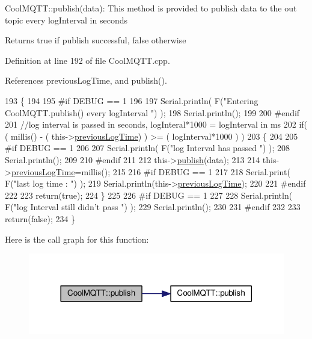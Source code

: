 Cool\+M\+Q\+T\+T\+::publish(data)\+: This method is provided to publish data to the out topic every log\+Interval in seconds

\begin{DoxyReturn}{Returns}
true if publish successful, false otherwise 
\end{DoxyReturn}


Definition at line 192 of file Cool\+M\+Q\+T\+T.\+cpp.



References previous\+Log\+Time, and publish().


\begin{DoxyCode}
193 \{
194 
195 \textcolor{preprocessor}{#if DEBUG == 1 }
196 
197     Serial.println( F(\textcolor{stringliteral}{"Entering CoolMQTT.publish() every logInterval "}) );
198     Serial.println();
199 
200 \textcolor{preprocessor}{#endif }
201     \textcolor{comment}{//log interval is passed in seconds, logInteral*1000 = logInterval in ms}
202     \textcolor{keywordflow}{if}( ( millis() - ( this->\hyperlink{classCoolMQTT_a3db37ef9ed3b05b2a8d44edba0e7d3cc}{previousLogTime})  ) >= ( logInterval*1000 ) )
203     \{
204     
205 \textcolor{preprocessor}{    #if DEBUG == 1}
206 
207         Serial.println( F(\textcolor{stringliteral}{"log Interval has passed "}) );
208         Serial.println();
209     
210 \textcolor{preprocessor}{    #endif}
211 
212         this->\hyperlink{classCoolMQTT_ace977b3e90ab14b1199fe5c4fb0a13ec}{publish}(data);
213 
214         this->\hyperlink{classCoolMQTT_a3db37ef9ed3b05b2a8d44edba0e7d3cc}{previousLogTime}=millis();
215     
216 \textcolor{preprocessor}{    #if DEBUG == 1 }
217 
218         Serial.print( F(\textcolor{stringliteral}{"last log time : "}) );
219         Serial.println(this->\hyperlink{classCoolMQTT_a3db37ef9ed3b05b2a8d44edba0e7d3cc}{previousLogTime});
220 
221 \textcolor{preprocessor}{    #endif}
222 
223         \textcolor{keywordflow}{return}(\textcolor{keyword}{true});
224     \}
225 
226 \textcolor{preprocessor}{#if DEBUG == 1 }
227 
228     Serial.println( F(\textcolor{stringliteral}{"log Interval still didn't pass "}) ); 
229     Serial.println();
230 
231 \textcolor{preprocessor}{#endif}
232 
233     \textcolor{keywordflow}{return}(\textcolor{keyword}{false});
234 \}
\end{DoxyCode}
Here is the call graph for this function\+:\nopagebreak
\begin{figure}[H]
\begin{center}
\leavevmode
\includegraphics[width=318pt]{classCoolMQTT_a613c5e3927ae85bb94fbf648d84d8780_cgraph}
\end{center}
\end{figure}
\mbox{\label{classCoolMQTT_ae3c18f6ae9723746d32765f1c8f176ca}} 
